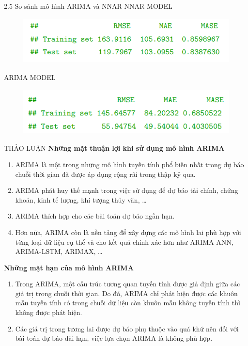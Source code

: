 \documentclass[notheorems,envcountsect,hyperref=unicode]{beamer}
\begin{document}
\begin{frame}{2.5 So sánh mô hình ARIMA và NNAR}
NNAR MODEL
	\begin{figure}[!htb]
	\centering
	\includegraphics[width=1\linewidth,height=2.5cm]{duong13} 
\end{figure}
ARIMA MODEL
	\begin{figure}[!htb]
	\centering
	\includegraphics[width=1\linewidth,height=2.5cm]{duong14} 
\end{figure}
\end{frame}

\begin{frame}{THẢO LUẬN}
\textbf{Những mặt thuận lợi khi sử dụng mô hình ARIMA}
\begin{enumerate}
\item ARIMA là một trong những mô hình tuyến tính phổ biến nhất trong dự báo chuỗi thời gian đã được áp dụng rộng rãi trong thập kỷ qua.
\item ARIMA phát huy thế mạnh trong việc sử dụng để dự báo tài chính, chứng khoán, kinh tế lượng, khí tượng thủy văn, \dots
\item ARIMA thích hợp cho các bài toán dự báo ngắn hạn.
\item Hơn nữa, ARIMA còn là nền tảng để xây dựng các mô hình lai phù hợp với từng loại dữ liệu cụ thể và cho kết quả chính xác hơn như ARIMA-ANN, ARIMA-LSTM, ARIMAX, \dots
\end{enumerate}
\end{frame}

\begin{frame}{}
\textbf{Những mặt hạn của mô hình ARIMA}
\begin{enumerate}
	\item Trong ARIMA, một cấu trúc tương quan tuyến tính được giả định giữa các giá trị trong chuỗi thời gian. Do đó, ARIMA chỉ phát hiện được các khuôn mẫu tuyến tính có trong chuỗi dữ liệu còn khuôn mẫu không tuyến tính thì không được phát hiện. 
\item Các giá trị trong tương lai được dự báo phụ thuộc vào quá khứ nên đối với bài toán dự báo dài hạn, việc lựa chọn ARIMA là không phù hợp.
\end{enumerate}
\end{frame}
\end{document}
